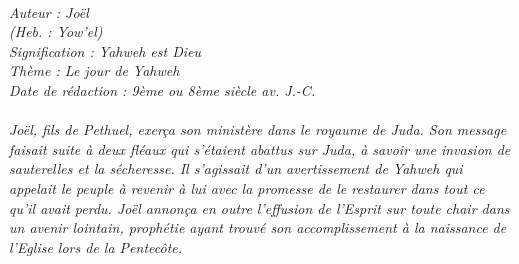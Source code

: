 \BFont
\noindent\hrulefill
{\footnotesize
\textit{
\bigskip
{\centering{}
\\Auteur : Joël
\\(Heb. : Yow'el)
\\Signification : Yahweh est Dieu
\\Thème : Le jour de Yahweh
\\Date de rédaction : 9ème ou 8ème siècle av. J.-C.\\}
}
\textit{
\\Joël, fils de Pethuel, exerça son ministère dans le royaume de Juda. Son message faisait suite à deux fléaux qui s’étaient abattus sur Juda, à savoir une invasion de sauterelles et la sécheresse. Il s’agissait d’un avertissement de Yahweh qui appelait le peuple à revenir à lui avec la promesse de le restaurer dans tout ce qu’il avait perdu. Joël annonça en outre l’effusion de l’Esprit sur toute chair dans un avenir lointain, prophétie ayant trouvé son accomplissement à la naissance de l’Eglise lors de la Pentecôte.\bigskip
}
}
\par\nobreak\noindent\hrulefill
